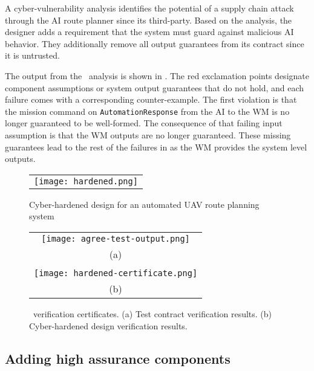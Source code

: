 A cyber-vulnerability analysis identifies the potential of a
supply chain attack through the AI route planner since its third-party.  Based on the analysis, the designer adds a requirement that the system must guard against malicious AI behavior.
They additionally remove all output guarantees from its contract since it is untrusted.

The output from the \agr\ analysis is shown in .  The red
exclamation points designate component assumptions or system output
guarantees that do not hold, and each failure comes with a
corresponding counter-example.  The first violation is that the mission command on \texttt{AutomationResponse} from
the AI to the WM is no longer guaranteed to be well-formed.  The
consequence of that failing input assumption is that the WM outputs
are no longer guaranteed.  These
missing guarantees lead to the rest of the failures
in  as the WM provides the system
level outputs.

\begin{figure*}
  \begin{center}
    \begin{tabular}{c}
      \texttt{[image: hardened.png]}
    \end{tabular}
  \end{center}
  \caption{Cyber-hardened design for an automated UAV route planning system}
  \label{fig:hardened}
\end{figure*}

\begin{figure}
  \begin{center}
    \begin{tabular}{c}
      \texttt{[image: agree-test-output.png]} \\
      (a) \\ \\
      \texttt{[image: hardened-certificate.png]} \\
      (b)
    \end{tabular}
  \end{center}
  \caption{\agr\ verification certificates. (a) Test contract verification results. (b) Cyber-hardened design verification results.}
  \label{fig:hardened-certificate}
\end{figure}

\subsection{Adding high assurance components}

